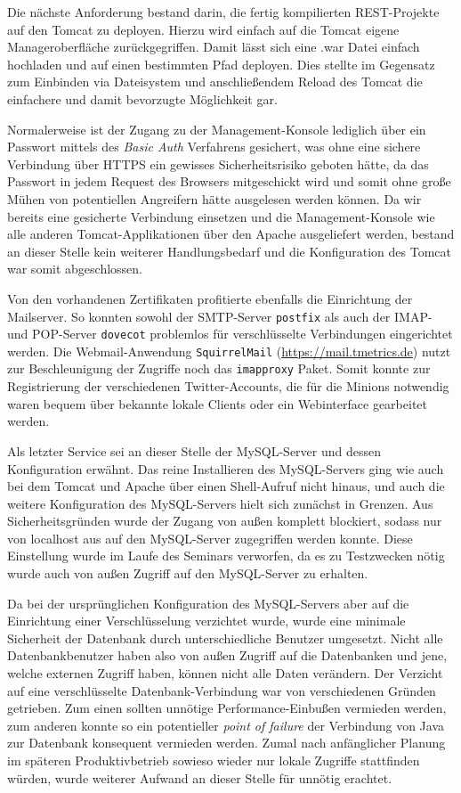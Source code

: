 Die nächste Anforderung bestand darin, die fertig kompilierten REST-Projekte auf den Tomcat zu deployen. Hierzu wird einfach auf die Tomcat eigene Manageroberfläche zurückgegriffen. Damit lässt sich eine .war Datei einfach hochladen und auf einen bestimmten Pfad deployen. Dies stellte im Gegensatz zum Einbinden via Dateisystem und anschließendem Reload des Tomcat die einfachere und damit bevorzugte Möglichkeit gar.

Normalerweise ist der Zugang zu der Management-Konsole lediglich über ein Passwort mittels des \textit{Basic Auth} Verfahrens gesichert, was ohne eine sichere Verbindung über HTTPS ein gewisses Sicherheitsrisiko geboten hätte, da das Passwort in jedem Request des Browsers mitgeschickt wird und somit ohne große Mühen von potentiellen Angreifern hätte ausgelesen werden können.
Da wir bereits eine gesicherte Verbindung einsetzen und die Management-Konsole wie alle anderen Tomcat-Applikationen über den Apache ausgeliefert werden, bestand an dieser Stelle kein weiterer Handlungsbedarf und die Konfiguration des Tomcat war somit abgeschlossen.

Von den vorhandenen Zertifikaten profitierte ebenfalls die Einrichtung der Mailserver. So konnten sowohl der SMTP-Server \texttt{postfix} als auch der IMAP- und POP-Server \texttt{dovecot} problemlos für verschlüsselte Verbindungen eingerichtet werden. Die Webmail-Anwendung \texttt{SquirrelMail} (\url{https://mail.tmetrics.de}) nutzt zur Beschleunigung der Zugriffe noch das \texttt{imapproxy} Paket. Somit konnte zur Registrierung der verschiedenen Twitter-Accounts, die für die Minions notwendig waren bequem über bekannte lokale Clients oder ein Webinterface gearbeitet werden.

Als letzter Service sei an dieser Stelle der MySQL-Server und dessen Konfiguration erwähnt. Das reine Installieren des MySQL-Servers ging wie auch bei dem Tomcat und Apache über einen Shell-Aufruf nicht hinaus, und auch die weitere Konfiguration des MySQL-Servers hielt sich zunächst in Grenzen.
Aus Sicherheitsgründen wurde der Zugang von außen komplett blockiert, sodass nur von localhost aus auf den MySQL-Server zugegriffen werden konnte.
Diese Einstellung wurde im Laufe des Seminars verworfen, da es zu Testzwecken nötig wurde auch von außen Zugriff auf den MySQL-Server zu erhalten.

Da bei der ursprünglichen Konfiguration des MySQL-Servers aber auf die Einrichtung einer Verschlüsselung verzichtet wurde, wurde eine minimale Sicherheit der Datenbank durch unterschiedliche Benutzer umgesetzt. Nicht alle Datenbankbenutzer haben also von außen Zugriff auf die Datenbanken und jene, welche externen Zugriff haben, können nicht alle Daten verändern.
Der Verzicht auf eine verschlüsselte Datenbank-Verbindung war von verschiedenen Gründen getrieben. Zum einen sollten unnötige Performance-Einbußen vermieden werden, zum anderen konnte so ein potentieller \textit{point of failure} der Verbindung von Java zur Datenbank konsequent vermieden werden. Zumal nach anfänglicher Planung im späteren Produktivbetrieb sowieso wieder nur lokale Zugriffe stattfinden würden, wurde weiterer Aufwand an dieser Stelle für unnötig erachtet.

